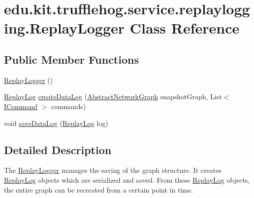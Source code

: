 \hypertarget{classedu_1_1kit_1_1trufflehog_1_1service_1_1replaylogging_1_1_replay_logger}{}\section{edu.\+kit.\+trufflehog.\+service.\+replaylogging.\+Replay\+Logger Class Reference}
\label{classedu_1_1kit_1_1trufflehog_1_1service_1_1replaylogging_1_1_replay_logger}
\subsection*{Public Member Functions}
\begin{DoxyCompactItemize}
\item 
\hyperlink{classedu_1_1kit_1_1trufflehog_1_1service_1_1replaylogging_1_1_replay_logger_a1fbb45af8fae81e2f13e85fdebbf20ed}{Replay\+Logger} ()
\item 
\hyperlink{classedu_1_1kit_1_1trufflehog_1_1service_1_1replaylogging_1_1_replay_log}{Replay\+Log} \hyperlink{classedu_1_1kit_1_1trufflehog_1_1service_1_1replaylogging_1_1_replay_logger_a4862893fea048110604e9e5d9cf06f14}{create\+Data\+Log} (\hyperlink{classedu_1_1kit_1_1trufflehog_1_1model_1_1graph_1_1_abstract_network_graph}{Abstract\+Network\+Graph} snapshot\+Graph, List$<$ \hyperlink{interfaceedu_1_1kit_1_1trufflehog_1_1command_1_1_i_command}{I\+Command} $>$ commands)
\item 
void \hyperlink{classedu_1_1kit_1_1trufflehog_1_1service_1_1replaylogging_1_1_replay_logger_a714803cd052c9a2269a814080cfeeadf}{save\+Data\+Log} (\hyperlink{classedu_1_1kit_1_1trufflehog_1_1service_1_1replaylogging_1_1_replay_log}{Replay\+Log} log)
\end{DoxyCompactItemize}


\subsection{Detailed Description}
The \hyperlink{classedu_1_1kit_1_1trufflehog_1_1service_1_1replaylogging_1_1_replay_logger}{Replay\+Logger} manages the saving of the graph structure. It creates \hyperlink{classedu_1_1kit_1_1trufflehog_1_1service_1_1replaylogging_1_1_replay_log}{Replay\+Log} objects which are serialized and saved. From these \hyperlink{classedu_1_1kit_1_1trufflehog_1_1service_1_1replaylogging_1_1_replay_log}{Replay\+Log} objects, the entire graph can be recreated from a certain point in time. 

